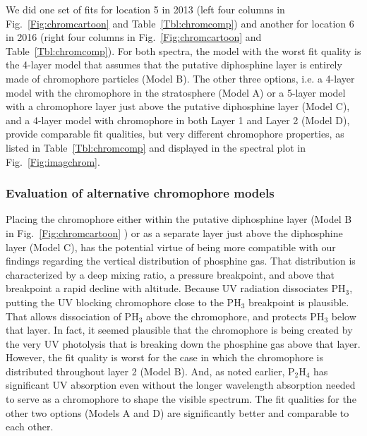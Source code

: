 \documentclass[article,11pt]{emulateapj}
\def\pht{PH$_3$ }
\def\phtx{PH$_3$}
\def\pthf{P$_2$H$_4$ }
\begin{document}
We did one set of fits for location 5 in 2013 (left four columns in
Fig.\ \ref{Fig:chromcartoon} and Table\ \ref{Tbl:chromcomp}) and
another for location 6 in 2016 (right four columns in
Fig.\ \ref{Fig:chromcartoon} and Table\ \ref{Tbl:chromcomp}).  For
both spectra, the model with the worst fit quality is the 4-layer
model that assumes that the putative diphosphine layer is entirely
made of chromophore particles (Model B).  The other three options,
i.e. a 4-layer model with the chromophore in the stratosphere (Model A) 
or a 5-layer model with a chromophore layer just above the putative
diphosphine layer (Model C), and a 4-layer model with chromophore in
both Layer 1 and Layer 2 (Model D), provide comparable fit qualities,
but very different chromophore properties, as listed in
Table\ \ref{Tbl:chromcomp} and displayed in the spectral plot in
Fig.\ \ref{Fig:imagchrom}.

\subsubsection{Evaluation of alternative chromophore models}
Placing the chromophore either within the putative diphosphine layer
(Model B in Fig.\ \ref{Fig:chromcartoon} ) or as a separate layer just
above the diphosphine layer (Model C), has the potential virtue of
being more compatible with our findings regarding the vertical
distribution of phosphine gas.  That distribution is characterized by
a deep mixing ratio, a pressure breakpoint, and above that breakpoint
a rapid decline with altitude.  Because UV radiation dissociates
\phtx, putting the UV blocking chromophore close to the \pht
breakpoint is plausible. That allows dissociation of \pht above the
chromophore, and protects \pht below that layer.  In fact, it seemed
plausible that the chromophore is being created by the very UV
photolysis that is breaking down the phosphine gas above that layer.
However, the fit quality is worst for the case in which the
chromophore is distributed throughout layer 2 (Model B).  And, as noted earlier,
\pthf has significant UV absorption even without the longer wavelength
absorption needed to serve as a chromophore to shape the visible
spectrum.  The fit qualities for the other two options (Models A and D) are
significantly better and comparable to each other.
\end{document}
